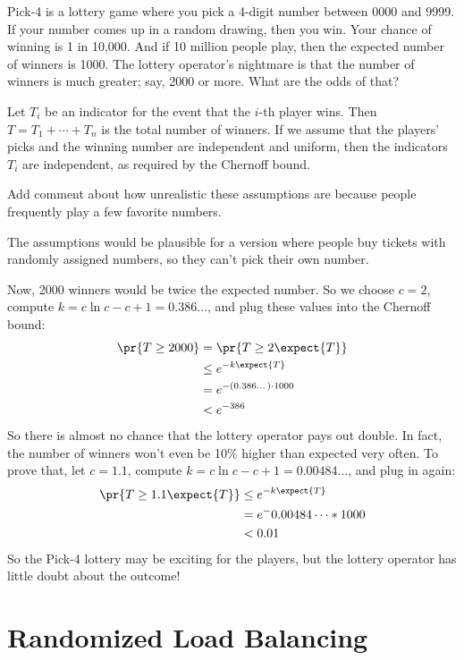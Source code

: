Pick-4 is a lottery game where you pick a 4-digit number between 0000
and 9999.  If your number comes up in a random drawing, then you win.
Your chance of winning is 1 in 10,000.  And if 10 million people play,
then the expected number of winners is 1000.  The lottery operator's
nightmare is that the number of winners is much greater; say, 2000 or
more.  What are the odds of that?

Let $T_i$ be an indicator for the event that the $i$-th player wins.
Then $T = T_1 + \cdots + T_n$ is the total number of winners.  If we
assume that the players' picks and the winning number are independent
and uniform, then the indicators $T_i$ are independent, as required by
the Chernoff bound.  
\begin{editingnotes}
Add comment about how unrealistic these assumptions are because people
frequently play a few favorite numbers.

The assumptions would be plausible for a version where people buy
tickets with randomly assigned numbers, so they can't pick their own
number.
\end{editingnotes}

Now, 2000 winners would be twice the expected
number.  So we choose $c = 2$, compute $k = c \ln c - c + 1 =
0.386\dots$, and plug these values into the Chernoff bound:
\begin{align*}
\pr{T \geq 2000} & = \pr{T \geq 2 \expect{T}} \\
  & \leq e^{-k \expect{T}} \\
  & = e^{- (0.386\dots) \cdot 1000} \\
  & < e^{-386}
\end{align*}
So there is almost no chance that the lottery operator pays out
double.  In fact, the number of winners won't even be 10\% higher than
expected very often.  To prove that, let $c = 1.1$, compute $k = c \ln
c - c + 1 = 0.00484\dots$, and plug in again:
\begin{align*}
\pr{T \geq 1.1 \expect{T}} & \leq e^{-k \expect{T}} \\
  & = e^- 0.00484\dots * 1000 \\
  & < 0.01
\end{align*}
So the Pick-4 lottery may be exciting for the players, but the lottery
operator has little doubt about the outcome!

\section{Randomized Load Balancing}

